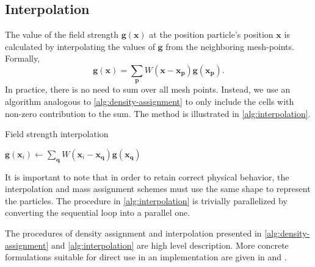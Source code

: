 \subsection{Interpolation}
The value of the field strength $\mathbf{g}(\mathbf{x})$ at the position particle's position $\mathbf{x}$ is calculated by interpolating the values of $\mathbf{g}$ from the neighboring mesh-points.
Formally,
\begin{equation*}
    \mathbf{g}(\mathbf{x}) = \sum_\mathbf{p} W(\mathbf{x} - \mathbf{x}_\mathbf{p}) \mathbf{g}(\mathbf{x}_\mathbf{p}).
\end{equation*}
In practice, there is no need to sum over all mesh points.
Instead, we use an algorithm analogous to \autoref{alg:density-assignment} to only include the cells with non-zero contribution to the sum.
The method is illustrated in \autoref{alg:interpolation}.
\begin{algorithm}
    \caption{Field strength interpolation}\label{alg:interpolation}
    \begin{algorithmic}
        \State $\mathbf{g}(\mathbf{x}_i) \gets \sum_\mathbf{q} W(\mathbf{x}_i - \mathbf{x}_\mathbf{q}) \mathbf{g}(\mathbf{x}_\mathbf{q})$
        \EndFor
        \EndFor
    \end{algorithmic}
\end{algorithm}
It is important to note that in order to retain correct physical behavior, the interpolation and mass assignment schemes must use the same shape to represent the particles.
The procedure in \autoref{alg:interpolation} is trivially parallelized by converting the sequential loop into a parallel one.

The procedures of density assignment and interpolation presented in \autoref{alg:density-assignment} and \autoref{alg:interpolation} are high level description.
More concrete formulations suitable for direct use in an implementation are given in \cite{Hockney1988} and \cite{Kravtsov2002PM}.